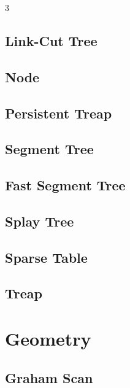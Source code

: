 \documentclass[8pt,a4paper,landscape,twoside]{extarticle}
\begin{document}
\begin{multicols*}{3}
\subsection{Link-Cut Tree}


\subsection{Node}


\subsection{Persistent Treap}


\subsection{Segment Tree}


\subsection{Fast Segment Tree}


\subsection{Splay Tree}


\subsection{Sparse Table}


\subsection{Treap}


\section{Geometry}

\subsection{Graham Scan}



\end{multicols*}
\end{document}
